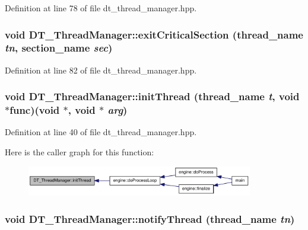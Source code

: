 Definition at line 78 of file dt\_\-thread\_\-manager.hpp.\hypertarget{class_d_t___thread_manager_abc92eae259720a889d8b1e180cda5fd4}{
\subsubsection[{exitCriticalSection}]{\setlength{\rightskip}{0pt plus 5cm}void DT\_\-ThreadManager::exitCriticalSection ({\bf thread\_\-name} {\em tn}, \/  {\bf section\_\-name} {\em sec})}}
\label{class_d_t___thread_manager_abc92eae259720a889d8b1e180cda5fd4}


Definition at line 82 of file dt\_\-thread\_\-manager.hpp.\hypertarget{class_d_t___thread_manager_a1f08551848fe9b3e01c8575190bcd2b6}{
\subsubsection[{initThread}]{\setlength{\rightskip}{0pt plus 5cm}void DT\_\-ThreadManager::initThread ({\bf thread\_\-name} {\em t}, \/  void $\ast$func)(void $\ast$, \/  void $\ast$ {\em arg})}}
\label{class_d_t___thread_manager_a1f08551848fe9b3e01c8575190bcd2b6}


Definition at line 40 of file dt\_\-thread\_\-manager.hpp.

Here is the caller graph for this function:\nopagebreak
\begin{figure}[H]
\begin{center}
\leavevmode
\includegraphics[width=280pt]{class_d_t___thread_manager_a1f08551848fe9b3e01c8575190bcd2b6_icgraph}
\end{center}
\end{figure}
\hypertarget{class_d_t___thread_manager_a9e4b737f0d47fd133023c117b44c2855}{
\subsubsection[{notifyThread}]{\setlength{\rightskip}{0pt plus 5cm}void DT\_\-ThreadManager::notifyThread ({\bf thread\_\-name} {\em tn})}}
\label{class_d_t___thread_manager_a9e4b737f0d47fd133023c117b44c2855}


